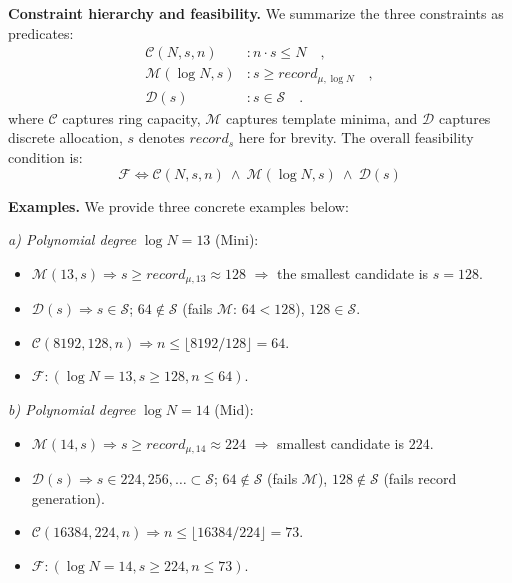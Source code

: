 \documentclass[letterpaper,journal]{IEEEtran}
\begin{document}
\noindent\textbf{Constraint hierarchy and feasibility.}
We summarize the three constraints as predicates:
\begin{subequations}
    \begin{align}
    \mathcal{C}(N,s,n) & : n \cdot s \leq N \quad, \\
    \mathcal{M}(\log N,s) & : s \geq record_{\mu,\log N} \quad, \\
    \mathcal{D}(s) & : s \in \mathcal{S} \quad.
    \end{align}
\end{subequations}
where $\mathcal{C}$ captures ring capacity, $\mathcal{M}$ captures template minima,
and $\mathcal{D}$ captures discrete allocation, $s$ denotes $record_s$ here for brevity. The overall feasibility condition is:
\begin{equation}
    \label{eq:feasibility_condition}
    \mathcal{F} \iff
    \mathcal{C}(N,s,n)\ \wedge\ \mathcal{M}(\log N,s)\ \wedge\ \mathcal{D}(s)
\end{equation}

\noindent\textbf{Examples.} We provide three concrete examples below:

\noindent\emph{a) Polynomial degree} $\log N=13$ (Mini):
\begin{itemize}
\item $\mathcal{M}(13,s) \Rightarrow s \geq record_{\mu,13} \approx 128$ $\Rightarrow$ the smallest candidate is $s=128$.
\item $\mathcal{D}(s) \Rightarrow s \in \mathcal{S}$; $64 \notin \mathcal{S}$ (fails $\mathcal{M}$: $64 < 128$), $128 \in \mathcal{S}$.
\item $\mathcal{C}(8192,128,n) \Rightarrow n \leq \lfloor 8192/128 \rfloor = 64$.
\item $\mathcal{F}: (\log N=13,s \geq 128,n \leq 64)$.
\end{itemize}

\noindent\emph{b) Polynomial degree} $\log N=14$ (Mid):
\begin{itemize}
\item $\mathcal{M}(14,s) \Rightarrow s \geq record_{\mu,14} \approx 224$ $\Rightarrow$ smallest candidate is $224$.
\item $\mathcal{D}(s) \Rightarrow s \in {224,256,\dots} \subset \mathcal{S}$; $64 \notin \mathcal{S}$ (fails $\mathcal{M}$), $128 \notin \mathcal{S}$ (fails record generation).
\item $\mathcal{C}(16384,224,n) \Rightarrow n \leq \lfloor 16384/224 \rfloor = 73$.
\item $\mathcal{F}: (\log N=14,s \geq 224,n \leq 73)$.
\end{itemize}
\end{document}
